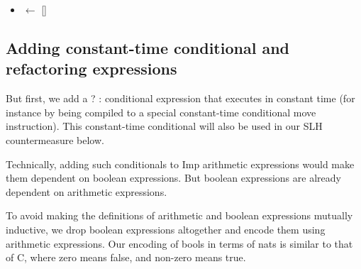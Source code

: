 \documentclass[12pt]{report}
\begin{document}
\begin{itemize}
\item  {} \ensuremath{\leftarrow} []  

\end{itemize}
\begin{coqdoccode}
\coqdocemptyline
\end{coqdoccode}
\subsection{Adding constant-time conditional and refactoring expressions}



 But first, we add a  ?  :  conditional expression that executes in
    constant time (for instance by being compiled to a special constant-time
    conditional move instruction). This constant-time conditional will also be
    used in our SLH countermeasure below. 

 Technically, adding such conditionals to Imp arithmetic expressions would
    make them dependent on boolean expressions. But boolean expressions are
    already dependent on arithmetic expressions. 

 To avoid making the definitions of arithmetic and boolean expressions
    mutually inductive, we drop boolean expressions altogether and encode them
    using arithmetic expressions. Our encoding of bools in terms of nats is
    similar to that of C, where zero means false, and non-zero means true. 
\end{document}
